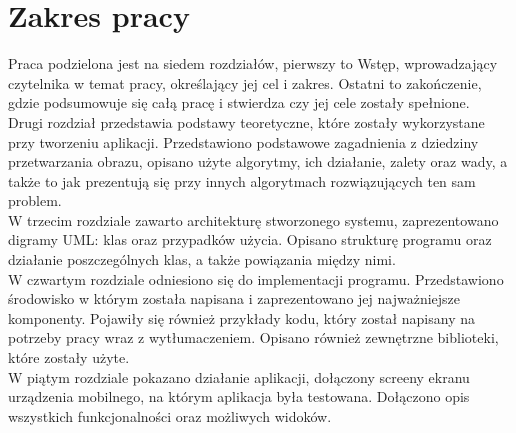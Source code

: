 \documentclass[eng,oneside]{mgr}
\begin{document}
\section{Zakres pracy}
Praca podzielona jest na siedem rozdziałów, pierwszy to Wstęp, wprowadzający czytelnika w temat pracy, określający jej cel i zakres. Ostatni to zakończenie, gdzie podsumowuje się całą pracę i stwierdza czy jej cele zostały spełnione. \\
Drugi rozdział przedstawia podstawy teoretyczne, które zostały wykorzystane przy tworzeniu aplikacji. Przedstawiono podstawowe zagadnienia z dziedziny przetwarzania obrazu, opisano użyte algorytmy, ich działanie, zalety oraz wady, a także to jak prezentują się przy innych algorytmach rozwiązujących ten sam problem.\\
W trzecim rozdziale zawarto architekturę stworzonego systemu, zaprezentowano digramy UML: klas oraz przypadków użycia. Opisano strukturę programu oraz działanie poszczególnych klas, a także powiązania między nimi. \\
W czwartym rozdziale odniesiono się do implementacji programu. Przedstawiono środowisko w którym została napisana i zaprezentowano jej najważniejsze komponenty. Pojawiły się również przykłady kodu, który został napisany na potrzeby pracy wraz z wytłumaczeniem. Opisano również zewnętrzne biblioteki, które zostały użyte.\\
W piątym rozdziale pokazano działanie aplikacji, dołączony screeny ekranu urządzenia mobilnego, na którym aplikacja była testowana. Dołączono opis wszystkich funkcjonalności oraz możliwych widoków. 
\end{document}
